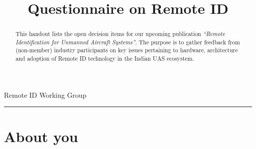 \documentclass{ua_wgs_questionnaire}
\title{Questionnaire on Remote ID}
\begin{document}
\maketitle
Remote ID Working Group
\begin{abstract}
This handout lists the open decision items for our upcoming publication
\emph{``Remote Identification for Unmanned Aircraft Systems''}.
The purpose is to gather feedback from (non-member) industry participants
on key issues pertaining to hardware, architecture and adoption of
Remote ID technology in the Indian UAS ecosystem. 
\end{abstract}
\begin{fullwidth}
\rule[0.5ex]{0.78\paperwidth}{1pt}
\end{fullwidth}

\section*{About you}
\end{document}

